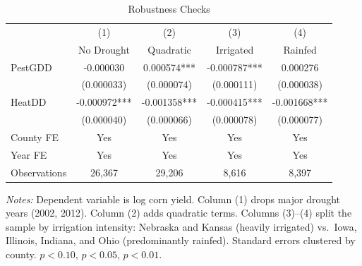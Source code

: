 \begin{table}[htbp]
\centering
\begin{threeparttable}
\caption{Robustness Checks}
\label{tab:robust}
\begin{tabular}{lcccc}
\toprule
 & (1) & (2) & (3) & (4) \\
 & No Drought & Quadratic & Irrigated & Rainfed \\
\midrule
PestGDD & -0.000030 & 0.000574*** & -0.000787*** & 0.000276 \\
 & (0.000033) & (0.000074) & (0.000111) & (0.000038) \\
HeatDD & -0.000972*** & -0.001358*** & -0.000415*** & -0.001668*** \\
 & (0.000040) & (0.000066) & (0.000078) & (0.000077) \\
\midrule
County FE & Yes & Yes & Yes & Yes \\
Year FE & Yes & Yes & Yes & Yes \\
Observations & 26,367 & 29,206 & 8,616 & 8,397 \\
\bottomrule
\end{tabular}
\begin{tablenotes}[flushleft]
\footnotesize
\item \textit{Notes:} Dependent variable is log corn yield. Column (1) drops major drought years (2002, 2012). Column (2) adds quadratic terms. Columns (3)--(4) split the sample by irrigation intensity: Nebraska and Kansas (heavily irrigated) vs.\ Iowa, Illinois, Indiana, and Ohio (predominantly rainfed). Standard errors clustered by county. \sym{*} $p<0.10$, \sym{**} $p<0.05$, \sym{***} $p<0.01$.
\end{tablenotes}
\end{threeparttable}
\end{table}
